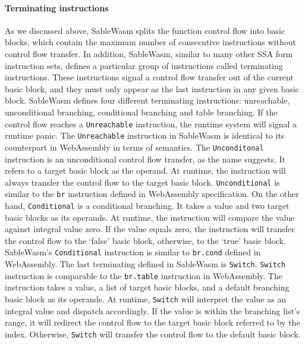 \paragraph{Terminating instructions}
As we discussed above, SableWasm splits the function control flow into basic
blocks, which contain the maximum number of consecutive instructions without
control flow transfer. In addition, SableWasm, similar to many other SSA form
instruction sets, defines a particular group of instructions called terminating
instructions. These instructions signal a control flow transfer out of the
current basic block, and they must only appear as the last instruction in any
given basic block. SableWasm defines four different terminating instructions:
unreachable, unconditional branching, conditional branching and table branching.
If the control flow reaches a \texttt{Unreachable} instruction, the runtime
system will signal a runtime panic. The \texttt{Unreachable} instruction in
SableWasm is identical to its counterpart in WebAssembly in terms of semantics.
The \texttt{Unconditonal} instruction is an unconditional control flow transfer,
as the name suggests. It refers to a target basic block as the operand. At
runtime, the instruction will always transfer the control flow to the target
basic block. \texttt{Unconditional} is similar to the \texttt{br} instruction
defined in WebAssembly specification. On the other hand, \texttt{Conditional}
is a conditional branching. It takes a value and two target basic blocks as its
operands. At runtime, the instruction will compare the value against integral
value zero. If the value equals zero, the instruction will transfer the control
flow to the `false' basic block, otherwise, to the `true' basic block.
SableWasm's \texttt{Conditional} instruction is similar to \texttt{br.cond}
defined in WebAssembly. The last terminating defined in SableWasm is
\texttt{Switch}. \texttt{Switch} instruction is comparable to the
\texttt{br.table} instruction in WebAssembly. The instruction takes a value, a
list of target basic blocks, and a default branching basic block as its
operands. At runtime, \texttt{Switch} will interpret the value as an integral
value and dispatch accordingly. If the value is within the branching list's
range, it will redirect the control flow to the target basic block referred to
by the index. Otherwise, \texttt{Switch} will transfer the control flow to the
default basic block.

